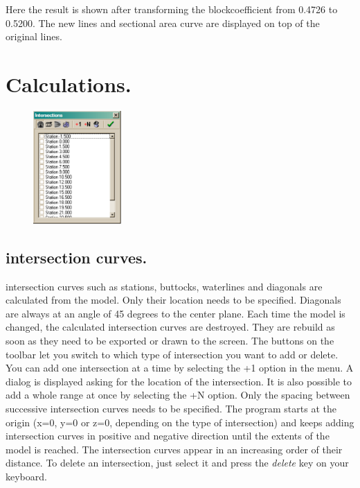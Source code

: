 \documentclass[12pt]{article}
\begin{document}
Here the result is shown after transforming the blockcoefficient from
0.4726 to 0.5200. The new lines and sectional area curve are displayed
on top of the original lines.

\pagebreak

\section{Calculations.}

\begin{figure}
        \centering
        \includegraphics[width=0.3\textwidth,natwidth=316,natheight=405]{intersectionsdialog.png}
        \caption{}
        \label{fig:intersection}
\end{figure}

\subsection{intersection curves.}
intersection curves such as stations, buttocks, waterlines and
diagonals are calculated from the model. Only their location needs to
be specified. Diagonals are always at an angle of 45 degrees to the
center plane. Each time the model is changed, the calculated
intersection curves are destroyed. They are rebuild as soon as they
need to be exported or drawn to the screen. The buttons on the toolbar
let you switch to which type of intersection you want to add or
delete. You can add one intersection at a time by selecting the +1
option in the menu. A dialog is displayed asking for the location of
the intersection. It is also possible to add a whole range at once by
selecting the +N option. Only the spacing between successive
intersection curves needs to be specified. The program starts at the
origin (x=0, y=0 or z=0, depending on the type of intersection) and
keeps adding intersection curves in positive and negative direction
until the extents of the model is reached. The intersection curves
appear in an increasing order of their distance. To delete an
intersection, just select it and press the \textit{delete} key on your
keyboard.
\end{document}
